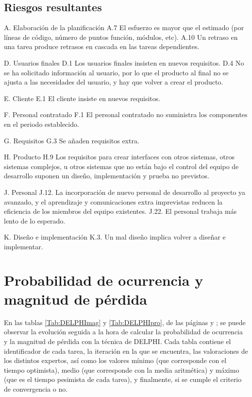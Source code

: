 \documentclass[11pt,a4paper,spanish,twoside]{report}
\begin{document}
\section{Riesgos resultantes}

A. Elaboración de la planificación
A.7 El esfuerzo es mayor que el estimado (por líneas de código, número de
puntos función, módulos, etc).
A.10 Un retraso en una tarea produce retrasos en cascada en las tareas
dependientes.

D. Usuarios finales
D.1 Los usuarios finales insisten en nuevos requisitos.
D.4 No se ha solicitado información al usuario, por lo que el producto al
final no se ajusta a las necesidades del usuario, y hay que volver a crear el
producto.

E. Cliente
E.1 El cliente insiste en nuevos requisitos.

F. Personal contratado
F.1 El personal contratado no suministra los componentes en el periodo
establecido.

G. Requisitos
G.3 Se añaden requisitos extra.

H. Producto
H.9 Los requisitos para crear interfaces con otros sistemas, otros sistemas
complejos, u otros sistemas que no están bajo el control del equipo de
desarrollo suponen un diseño, implementación y prueba no previstos.

J. Personal
J.12. La incorporación de nuevo personal de desarrollo al proyecto ya
avanzado, y el aprendizaje y comunicaciones extra imprevistas reducen la
eficiencia de los miembros del equipo existentes.
J.22. El personal trabaja más lento de lo esperado.

K. Diseño e implementación
K.3. Un mal diseño implica volver a diseñar e implementar.

\chapter{Probabilidad de ocurrencia y magnitud de pérdida} 
En las tablas \ref{Tab:DELPHImag} y \ref{Tab:DELPHIpro}, de las páginas
\pageref{Tab:DELPHImag} y \pageref{Tab:DELPHIimp}; se  
puede observar la evolución seguida a la hora de calcular la probabilidad de
ocurrencia y la magnitud de pérdida con la técnica de DELPHI. Cada tabla
contiene el identificador de cada tarea, la iteración en 
la que se encuentra, las valoraciones de los distintos expertos, así como los
valores mínimo (que corresponde con el tiempo optimista), medio (que
corresponde con la media aritmética) y máximo (que es el tiempo pesimista de
cada tarea), y finalmente, si se cumple el criterio de convergencia o no.
\end{document}

